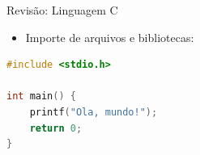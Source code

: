 \begin{frame}[fragile]{Revisão: Linguagem C}
    \begin{itemize}
        \item Importe de arquivos e bibliotecas:
    \end{itemize}

\begin{lstlisting}[language=C]
#include <stdio.h>

int main() {
    printf("Ola, mundo!");
    return 0;
}
\end{lstlisting}

\end{frame}